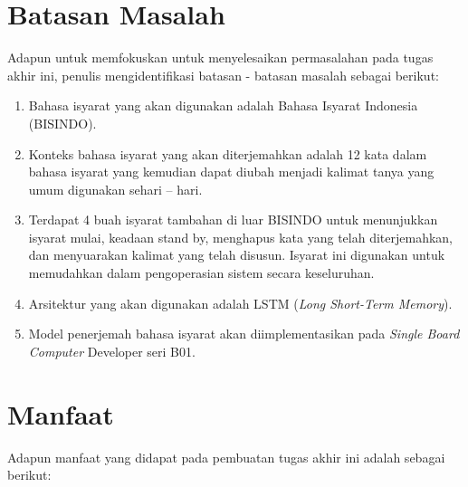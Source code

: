 \newpage

\section{Batasan Masalah}
\label{sec:batasanmasalah}

Adapun untuk memfokuskan untuk menyelesaikan permasalahan pada tugas akhir ini, penulis mengidentifikasi batasan - batasan masalah sebagai berikut:

\begin{enumerate}[nolistsep]

  \item Bahasa isyarat yang akan digunakan adalah Bahasa Isyarat Indonesia (BISINDO).

  \item Konteks bahasa isyarat yang akan diterjemahkan adalah 12 kata dalam bahasa isyarat yang kemudian dapat diubah menjadi kalimat tanya yang umum digunakan sehari – hari.

  \item Terdapat 4 buah isyarat tambahan di luar BISINDO untuk menunjukkan isyarat mulai, keadaan stand by, menghapus kata yang telah diterjemahkan, dan menyuarakan kalimat yang telah disusun. Isyarat ini digunakan untuk memudahkan dalam pengoperasian sistem secara keseluruhan.

  \item Arsitektur yang akan digunakan adalah LSTM (\emph{Long Short-Term Memory}).
  
  \item Model penerjemah bahasa isyarat akan diimplementasikan pada \emph{Single Board Computer} Developer seri B01.
\end{enumerate}

\section{Manfaat}
\label{sec:manfaatpenulisan}

Adapun manfaat yang didapat pada pembuatan tugas akhir ini adalah sebagai berikut:

